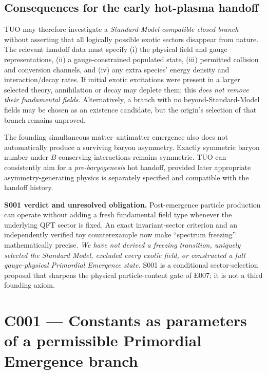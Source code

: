 \documentclass[11pt,a4paper]{article}
\theoremstyle{tmon}
\theoremstyle{definition}
\begin{document}
\subsection{Consequences for the early hot-plasma handoff}
TUO may therefore investigate a \emph{Standard-Model-compatible closed branch} without asserting that all logically possible exotic sectors disappear from nature. The relevant handoff data must specify (i) the physical field and gauge representations, (ii) a gauge-constrained populated state, (iii) permitted collision and conversion channels, and (iv) any extra species' energy density and interaction/decay rates. If initial exotic excitations were present in a larger selected theory, annihilation or decay may deplete them; this \emph{does not remove their fundamental fields}. Alternatively, a branch with no beyond-Standard-Model fields may be chosen as an existence candidate, but the origin's selection of that branch remains unproved.

The founding simultaneous matter--antimatter emergence also does not automatically produce a surviving baryon asymmetry. Exactly symmetric baryon number under $B$-conserving interactions remains symmetric. TUO can consistently aim for a \emph{pre-baryogenesis} hot handoff, provided later appropriate asymmetry-generating physics is separately specified and compatible with the handoff history.

\begin{warningbox}
\textbf{S001 verdict and unresolved obligation.} Post-emergence particle production can operate without adding a fresh fundamental field type whenever the underlying QFT sector is fixed. An exact invariant-sector criterion and an independently verified toy counterexample now make ``spectrum freezing'' mathematically precise. \emph{We have not derived a freezing transition, uniquely selected the Standard Model, excluded every exotic field, or constructed a full gauge-physical Primordial Emergence state.} S001 is a conditional sector-selection proposal that sharpens the physical particle-content gate of E007; it is not a third founding axiom.
\end{warningbox}

\clearpage

\clearpage
\section{C001 --- Constants as parameters of a permissible Primordial Emergence branch}\label{sec:c001}
\end{document}

